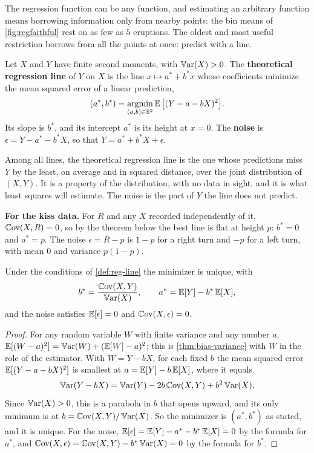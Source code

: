 The regression function can be any function, and estimating an arbitrary function means borrowing information only from nearby points: the bin means of \cref{fig:regfaithful} rest on as few as $5$ eruptions.
The oldest and most useful restriction borrows from all the points at once: predict with a line.

\begin{definition}
\label{def:reg-line}
Let $X$ and $Y$ have finite second moments, with $\operatorname*{\mathbb{V}\text{ar}}(X) > 0$.
The \textbf{theoretical regression line} of $Y$ on $X$ is the line $x \mapsto a^* + b^*x$ whose coefficients minimize the mean squared error of a linear prediction,
\[
(a^*, b^*) = \operatorname*{argmin}_{(a, b) \in \mathbb{R}^2} \operatorname*{\mathbb{E}}\big[(Y - a - bX)^2\big].
\]
Its slope is $b^*$, and its intercept $a^*$ is its height at $x = 0$.
The \textbf{noise} is $\epsilon = Y - a^* - b^*X$, so that $Y = a^* + b^*X + \epsilon$.
\end{definition}

\begin{inwords}
Among all lines, the theoretical regression line is the one whose predictions miss $Y$ by the least, on average and in squared distance, over the joint distribution of $(X, Y)$. It is a property of the distribution, with no data in sight, and it is what least squares will estimate. The noise is the part of $Y$ the line does not predict.

\textbf{For the kiss data.} For $R$ and any $X$ recorded independently of it, $\operatorname*{\mathbb{C}\text{ov}}(X, R) = 0$, so by the theorem below the best line is flat at height $p$: $b^* = 0$ and $a^* = p$. The noise $\epsilon = R - p$ is $1 - p$ for a right turn and $-p$ for a left turn, with mean $0$ and variance $p(1 - p)$.
\end{inwords}

\begin{theorem}
\label{thm:reg-line}
Under the conditions of \cref{def:reg-line} the minimizer is unique, with
\[
b^* = \frac{\operatorname*{\mathbb{C}\text{ov}}(X, Y)}{\operatorname*{\mathbb{V}\text{ar}}(X)}, \qquad a^* = \operatorname*{\mathbb{E}}[Y] - b^*\operatorname*{\mathbb{E}}[X],
\]
and the noise satisfies $\operatorname*{\mathbb{E}}[\epsilon] = 0$ and $\operatorname*{\mathbb{C}\text{ov}}(X, \epsilon) = 0$.
\end{theorem}
\begin{proof}
For any random variable $W$ with finite variance and any number $a$, $\operatorname*{\mathbb{E}}[(W - a)^2] = \operatorname*{\mathbb{V}\text{ar}}(W) + (\operatorname*{\mathbb{E}}[W] - a)^2$; this is \cref{thm:bias-variance} with $W$ in the role of the estimator.
With $W = Y - bX$, for each fixed $b$ the mean squared error $\operatorname*{\mathbb{E}}[(Y - a - bX)^2]$ is smallest at $a = \operatorname*{\mathbb{E}}[Y] - b\operatorname*{\mathbb{E}}[X]$, where it equals
\[
\operatorname*{\mathbb{V}\text{ar}}(Y - bX) = \operatorname*{\mathbb{V}\text{ar}}(Y) - 2b\operatorname*{\mathbb{C}\text{ov}}(X, Y) + b^2\operatorname*{\mathbb{V}\text{ar}}(X).
\]
Since $\operatorname*{\mathbb{V}\text{ar}}(X) > 0$, this is a parabola in $b$ that opens upward, and its only minimum is at $b = \operatorname*{\mathbb{C}\text{ov}}(X, Y)/\operatorname*{\mathbb{V}\text{ar}}(X)$.
So the minimizer is $(a^*, b^*)$ as stated, and it is unique.
For the noise, $\operatorname*{\mathbb{E}}[\epsilon] = \operatorname*{\mathbb{E}}[Y] - a^* - b^*\operatorname*{\mathbb{E}}[X] = 0$ by the formula for $a^*$, and $\operatorname*{\mathbb{C}\text{ov}}(X, \epsilon) = \operatorname*{\mathbb{C}\text{ov}}(X, Y) - b^*\operatorname*{\mathbb{V}\text{ar}}(X) = 0$ by the formula for $b^*$.
\end{proof}

